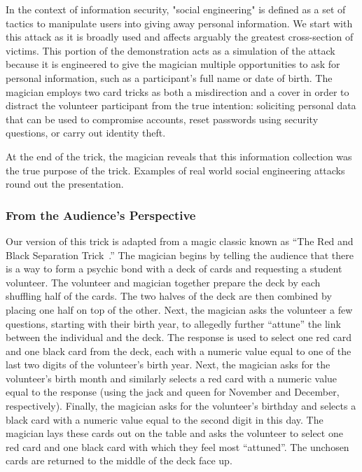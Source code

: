 In the context of information security,
"social engineering" is defined as a set
of tactics to manipulate users into giving away personal information.
We start with this attack as it is broadly used and affects arguably the
greatest cross-section of victims.  This portion of the demonstration
acts as a simulation of the attack because it is engineered to give
the magician multiple opportunities to ask for personal information,
such as a participant's full name or date of birth.
The magician employs two card tricks
as
both a misdirection and a cover
in order to
distract the
volunteer participant from
the true intention: soliciting
personal data that
can be used to compromise accounts,
reset passwords using security questions, or
carry out identity theft.

At the end of the trick, the magician reveals that this information
collection was the true purpose of the trick.
Examples of real world social engineering attacks round out the
presentation.

\subsubsection{From the Audience's Perspective}

Our version of this trick is adapted from a magic classic
known as ``The Red and Black Separation Trick~\cite{redblackseparation}.''
The magician begins by
telling the audience that there
is a way to form a psychic bond with a deck of cards
and requesting a student volunteer.
The volunteer and magician
together prepare the deck
by each shuffling half of the cards.
The two halves of the deck are then combined by placing one half
on top of the other.
Next, the magician asks the volunteer
a few questions, starting with their birth year,
to allegedly further ``attune''
the link between the individual and the deck.
The response
is used to select one red card and one black card from the deck,
each with a numeric value equal to one of the last two digits of
the volunteer's birth year.
Next, the magician asks for the volunteer's birth month and similarly selects
a red card with a numeric value equal
to the response (using the jack and queen for November and December,
respectively).
Finally, the magician asks
for the volunteer's birthday and selects a black card with a numeric value
equal to the second digit in this day.
The magician lays these cards out on the table and asks the volunteer to select
one red card and one black card with which they feel most ``attuned''.
The unchosen cards are returned to the middle
of the deck face up.

